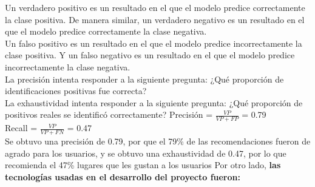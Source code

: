 \documentclass[12pt,letterpaper,openany]{book}
\begin{document}
Un verdadero positivo es un resultado en el que el modelo predice correctamente la clase positiva. De manera similar, un verdadero negativo es un resultado en el que el modelo predice correctamente la clase negativa.\\
Un falso positivo es un resultado en el que el modelo predice incorrectamente la clase positiva. Y un falso negativo es un resultado en el que el modelo predice incorrectamente la clase negativa.\\
La precisión intenta responder a la siguiente pregunta: ¿Qué proporción de identificaciones positivas fue correcta?\\
La exhaustividad intenta responder a la siguiente pregunta: ¿Qué proporción de positivos reales se identificó correctamente?\cite{13}\cite{26}
\vspace{5mm}\newline
Precisión = $\frac{VP}{VP+FP}$ = 0.79 \\
Recall = $\frac{VP}{VP+FN}$ = 0.47\\
\newline
Se obtuvo una precisión de 0.79, por que el 79\% de las recomendaciones fueron de agrado para los usuarios, y se obtuvo una exhaustividad de 0.47, por lo que recomienda el 47\% lugares que les gustan a los usuarios
\vspace{5mm}\newline
Por otro lado, \textbf{las tecnologías usadas en el desarrollo del proyecto fueron:}
\end{document}
